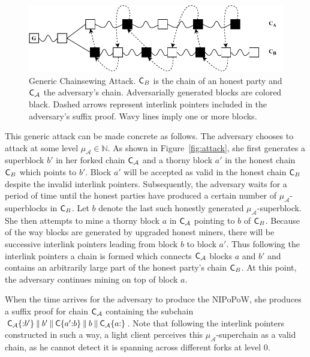 \begin{figure}[h]
	\begin{center}
		\includegraphics[width=0.95\columnwidth
		]{figures/generic_chainsewing_attack.pdf}
	\end{center}
	\caption{Generic Chainsewing Attack. $\mathsf{C}_B$ is the chain of an honest party and $\mathsf{C}_\mathcal{A}$ the adversary's chain. Adversarially generated blocks are 	colored black. Dashed arrows represent interlink pointers included in the	adversary's suffix proof. Wavy lines imply one or more blocks.}
	\label{fig:generic_attack}
\end{figure}

This generic attack can be made concrete as follows.
The adversary chooses to attack at some level $\mu_\mathcal{A} \in \mathbb{N}$. As shown in Figure~\ref{fig:attack}, she first generates a superblock $b'$ in her forked chain $\mathsf{C}_\mathcal{A}$ and a thorny block $a'$ in the honest chain $\mathsf{C}_B$ which points to $b'$. Block $a'$ will be accepted as valid in the honest chain $\mathsf{C}_B$ despite the invalid interlink pointers. Subsequently, the adversary waits for a period of time until the honest parties have produced a certain number of $\mu_\mathcal{A}$-superblocks in $\mathsf{C}_B$.
Let $b$ denote the last such honestly generated $\mu_\mathcal{A}$-superblock.
She then attempts to mine a thorny block $a$ in $\mathsf{C}_\mathcal{A}$ pointing to $b$ of $\mathsf{C}_B$. Because of the way blocks are generated by upgraded honest miners, there will be successive interlink pointers leading from block $b$ to block $a'$. Thus following the interlink pointers a chain is formed which connects $\mathsf{C}_\mathcal{A}$ blocks $a$ and $b'$ and contains an arbitrarily large part of the honest party's chain $\mathsf{C}_B$. At this point, the adversary continues mining on top of block $a$.

When the time arrives for the adversary to produce the NIPoPoW, she produces a suffix proof for chain $\mathsf{C}_\mathcal{A}$ containing the subchain $\mathsf{C}_\mathcal{A}\{{:}b'\} \mathbin{\|} b' \mathbin{\|} \mathsf{C}\{a'{:}b\} \mathbin{\|} b \mathbin{\|} \mathsf{C}_\mathcal{A}\{a{:}\}$. Note that following the interlink pointers constructed in such a way, a light client perceives this $\mu_\mathcal{A}$-superchain as a valid chain, as he cannot detect it is spanning across different forks at level $0$.

